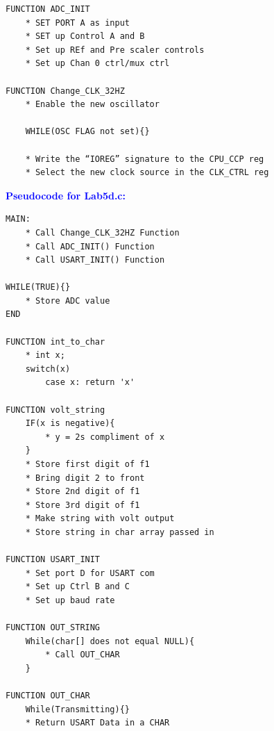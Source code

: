 \documentclass[11pt]{article}
\theoremstyle{plain}
\theoremstyle{definition}
\begin{document}
\begin{tcolorbox}
\begin{verbatim}
FUNCTION ADC_INIT
    * SET PORT A as input
    * SET up Control A and B
    * Set up REf and Pre scaler controls
    * Set up Chan 0 ctrl/mux ctrl

FUNCTION Change_CLK_32HZ
    * Enable the new oscillator

    WHILE(OSC FLAG not set){}

    * Write the “IOREG” signature to the CPU_CCP reg
    * Select the new clock source in the CLK_CTRL reg
\end{verbatim}
\end{tcolorbox}
%
%
\newpage
\textbf{\textcolor{blue}{Pseudocode for Lab5d.c:}}   
\begin{tcolorbox}
\begin{verbatim}    
MAIN:
    * Call Change_CLK_32HZ Function
    * Call ADC_INIT() Function
    * Call USART_INIT() Function

WHILE(TRUE){}
    * Store ADC value
END

FUNCTION int_to_char
    * int x;
    switch(x)
        case x: return 'x'

FUNCTION volt_string
    IF(x is negative){
        * y = 2s compliment of x
    }
    * Store first digit of f1
    * Bring digit 2 to front
    * Store 2nd digit of f1
    * Store 3rd digit of f1
    * Make string with volt output
    * Store string in char array passed in

FUNCTION USART_INIT
    * Set port D for USART com
    * Set up Ctrl B and C
    * Set up baud rate

FUNCTION OUT_STRING
    While(char[] does not equal NULL){
        * Call OUT_CHAR
    }

FUNCTION OUT_CHAR
    While(Transmitting){}
    * Return USART Data in a CHAR
\end{verbatim}
\end{tcolorbox}
\end{document}
